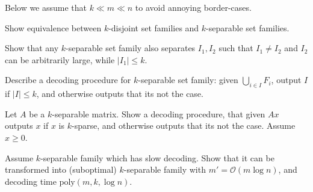 \documentclass[12pt]{uebung}
\begin{document}
 

\newcommand{\bigo}{\mathcal{O}}
\renewcommand{\aufgname}{Exercise}

Below we assume that $k \ll m \ll n$ to avoid annoying border-cases.
\begin{aufg}
Show equivalence between $k$-disjoint set families and $k$-separable set families.
\end{aufg}

\begin{aufg}
Show that any $k$-separable set family also separates $I_1,I_2$ such that $I_1 \not= I_2$ and $I_2$ can be arbitrarily large, while $|I_1| \le k$.
\end{aufg}

\begin{aufg}
Describe a decoding procedure for $k$-separable set family: given $\bigcup_{i \in I} F_i$, output $I$ if $|I| \le k$, and otherwise outputs that its not the case.
\end{aufg}

\begin{aufg}
Let $A$ be a $k$-separable matrix.  Show a decoding procedure, that given $Ax$ outputs $x$ if $x$ is $k$-sparse, and otherwise outputs that its not the case. Assume $x \ge 0$.
\end{aufg}

\begin{aufg}[2 pts]
Assume $k$-separable family which has slow decoding. Show that it can be transformed into (suboptimal) $k$-separable family with $m' = \bigo(m \log n)$, and decoding time $\textrm{poly}(m,k,\log n)$.
\end{aufg}
\end{document}
